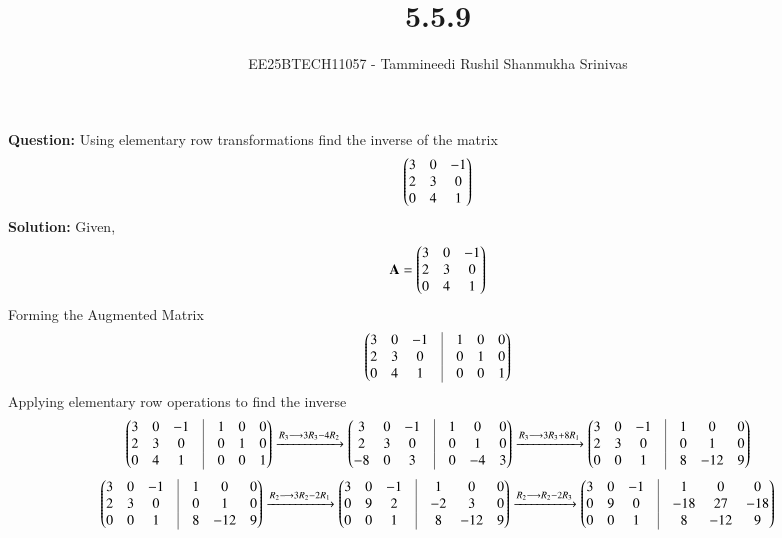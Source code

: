 \documentclass[journal,12pt,onecolumn]{IEEEtran}
\theoremstyle{remark}
\begin{document}
\title{5.5.9}
\author{EE25BTECH11057 - Tammineedi Rushil Shanmukha Srinivas}
\maketitle
\renewcommand{\thefigure}{\theenumi}
\renewcommand{\thetable}{\theenumi}
\textbf{Question:} Using elementary row transformations find the inverse of the matrix 
\begin{align}
\begin{pmatrix}3&0&-1\\
       2&3&0\\
       0&4&1\end{pmatrix}
\end{align}
\textbf{Solution:}
Given, \begin{align} 
\mathbf{A}=\begin{pmatrix}3&0&-1\\
       2&3&0\\
       0&4&1\end{pmatrix}
       \end{align}
Forming the Augmented Matrix
\begin{align}
\myvec{3&0&-1 &\vrule& 1&0&0 \\
       2&3&0 &\vrule&  0&1&0 \\
       0&4&1 &\vrule&  0&0&1 }
\end{align}
Applying elementary row operations to find the inverse
\begin{align}
\myvec{3&0&-1 &\vrule& 1&0&0 \\
       2&3&0 &\vrule&  0&1&0 \\
       0&4&1 &\vrule&  0&0&1 } \xrightarrow{R_3 \longrightarrow 3R_3-4R_2}
       \myvec{3&0&-1 &\vrule& 1&0&0 \\
       2&3&0 &\vrule&  0&1&0 \\
       -8&0&3 &\vrule&  0&-4&3} \xrightarrow{R_3 \longrightarrow 3R_3+8R_1}
       \myvec{3&0&-1 &\vrule& 1&0&0 \\
       2&3&0 &\vrule&  0&1&0 \\
       0&0&1 &\vrule&  8&-12&9} 
\end{align}
\begin{align}
 \myvec{3&0&-1 &\vrule& 1&0&0 \\
       2&3&0 &\vrule&  0&1&0 \\
       0&0&1 &\vrule&  8&-12&9} \xrightarrow{R_2 \longrightarrow 3R_2-2R_1}
    \myvec{3&0&-1 &\vrule& 1&0&0 \\
       0&9&2 &\vrule&  -2&3&0 \\
       0&0&1 &\vrule&  8&-12&9} \xrightarrow{R_2 \longrightarrow R_2-2R_3}
        \myvec{3&0&-1 &\vrule& 1&0&0 \\
       0&9&0 &\vrule&  -18&27&-18 \\
       0&0&1 &\vrule&  8&-12&9} 
\end{align}
\end{document}
